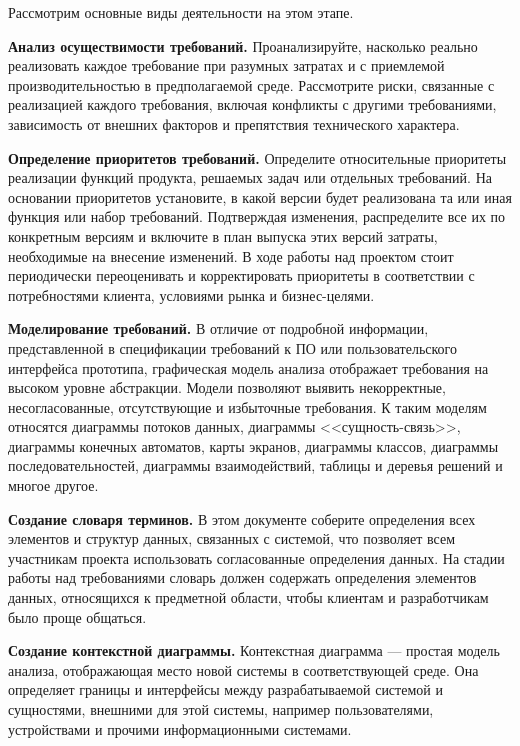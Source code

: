\documentclass{../../text-style}
\begin{document}
Рассмотрим основные виды деятельности на этом этапе.

\textbf{Анализ осуществимости требований.} Проанализируйте, насколько реально реализовать каждое требование при разумных затратах и с приемлемой производительностью в предполагаемой среде. Рассмотрите риски, связанные с реализацией каждого требования, включая конфликты с другими требованиями, зависимость от внешних факторов и препятствия технического характера.

\textbf{Определение приоритетов требований.} Определите относительные приоритеты реализации функций продукта, решаемых задач или отдельных требований. На основании приоритетов установите, в какой версии будет реализована та или иная функция или набор требований. Подтверждая изменения, распределите все их по конкретным версиям и включите в план выпуска этих версий затраты, необходимые на внесение изменений. В ходе работы над проектом стоит периодически переоценивать и корректировать приоритеты в соответствии с потребностями клиента, условиями рынка и бизнес-целями.

\textbf{Моделирование требований.} В отличие от подробной информации, представленной в спецификации требований к ПО или пользовательского интерфейса прототипа, графическая модель анализа отображает требования на высоком уровне абстракции. Модели позволяют выявить некорректные, несогласованные, отсутствующие и избыточные требования. К таким моделям относятся диаграммы потоков данных, диаграммы <<сущность-связь>>, диаграммы конечных автоматов, карты экранов, диаграммы классов, диаграммы последовательностей, диаграммы взаимодействий, таблицы и деревья решений и многое другое.

\textbf{Создание словаря терминов.} В этом документе соберите определения всех элементов и структур данных, связанных с системой, что позволяет всем участникам проекта использовать согласованные определения данных. На стадии работы над требованиями словарь должен содержать определения элементов данных, относящихся к предметной области, чтобы клиентам и разработчикам было проще общаться. 

\textbf{Создание контекстной диаграммы.} Контекстная диаграмма --- простая модель анализа, отображающая место новой системы в соответствующей среде. Она определяет границы и интерфейсы между разрабатываемой системой и сущностями, внешними для этой системы, например пользователями, устройствами и прочими информационными системами. 
\end{document}
